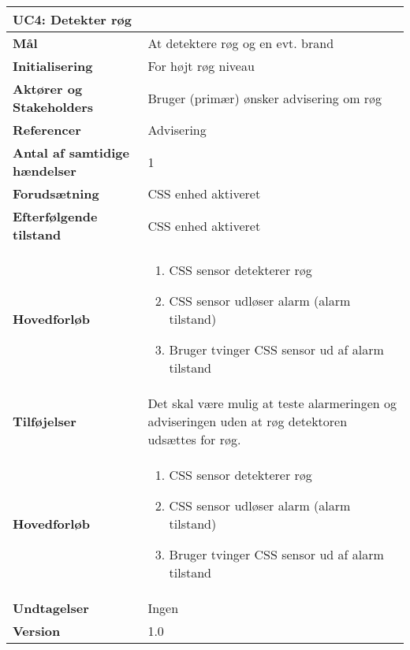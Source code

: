 \begin{table}[H] \centering
\begin{tabular}{|p{6cm}|p{8cm}|}
	\hline
\multicolumn{2}{|l|}{\textbf{UC4: Detekter røg}} \\\hline
\textbf{Mål}								&At detektere røg og en evt. brand \\\hline
\textbf{Initialisering}					&For højt røg niveau\\\hline
\textbf{Aktører og Stakeholders}			&Bruger (primær) ønsker advisering om røg \\\hline
\textbf{Referencer}						&Advisering \\\hline
\textbf{Antal af samtidige hændelser}	&1 \\\hline
\textbf{Forudsætning}					&CSS enhed aktiveret  \\\hline
\textbf{Efterfølgende tilstand}			&CSS enhed aktiveret \\\hline
\textbf{Hovedforløb}						&\begin{enumerate}
\item CSS sensor detekterer røg 

\item CSS sensor udløser alarm (alarm tilstand)

\item Bruger tvinger CSS sensor ud af alarm tilstand

\end{enumerate}\\\hline

\textbf{Tilføjelser}						&Det skal være mulig at teste alarmeringen og adviseringen uden at røg detektoren udsættes for røg.\\\hline
\textbf{Hovedforløb}						&  
\begin{enumerate}
\item CSS sensor detekterer røg
\item CSS sensor udløser alarm (alarm tilstand)
\item Bruger tvinger CSS sensor ud af alarm tilstand
\end{enumerate} \\\hline
\textbf{Undtagelser}						&Ingen \\\hline
		\textbf{Version}		&1.0 \\\hline
	\end{tabular}
	\label{UC4} 
\end{table}